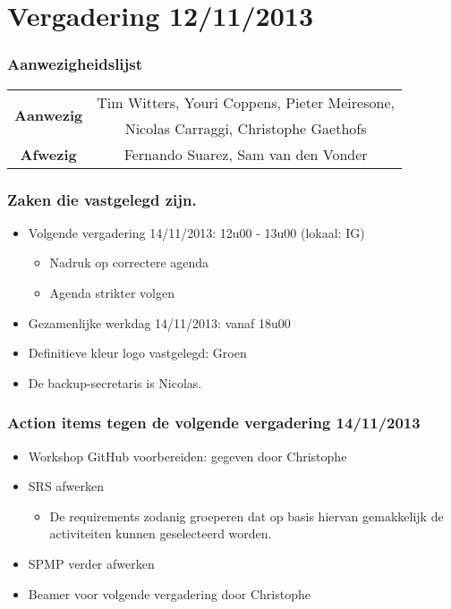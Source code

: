 \section{Vergadering 12/11/2013}

\subsubsection{Aanwezigheidslijst}
\begin{table}[htbp]
	\centering
	\begin{tabular}{c|c}
		\multirow{2}{*}{\textbf{Aanwezig}} & Tim Witters, Youri Coppens, Pieter Meiresone, \\
		& Nicolas Carraggi,  Christophe Gaethofs \\
		\hline
		\textbf{Afwezig} &  Fernando Suarez, Sam van den Vonder \\
	\end{tabular}
\end{table}

\subsubsection{Zaken die vastgelegd zijn.}
\begin{itemize}
	\item 
		Volgende vergadering 14/11/2013: 12u00 - 13u00 (lokaal: IG)
		\begin{itemize}
			\item Nadruk op correctere agenda
			\item Agenda strikter volgen
		\end{itemize}
	\item Gezamenlijke werkdag 14/11/2013: vanaf 18u00
	\item Definitieve kleur logo vastgelegd: Groen
	\item De backup-secretaris is Nicolas.
\end{itemize}

\subsubsection{Action items tegen de volgende vergadering 14/11/2013}
\begin{itemize}
	\item 
		Workshop GitHub voorbereiden: gegeven door Christophe
	\item 
		SRS afwerken
		\begin{itemize}
			\item De requirements zodanig groeperen dat op basis hiervan gemakkelijk de activiteiten kunnen geselecteerd worden.
		\end{itemize}
	\item 
		SPMP verder afwerken
	\item
		Beamer voor volgende vergadering door Christophe
		
\end{itemize}

